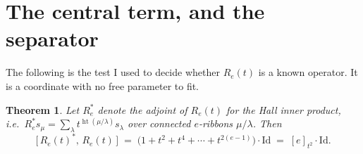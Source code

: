 \documentclass[11pt]{article}
\newtheorem{theorem}{Theorem}
\theoremstyle{definition}
\newcommand{\hgt}{\operatorname{ht}}          %
\begin{document}
\section{The central term, and the separator}

The following is the test I used to decide whether $R_e(t)$ is a known operator.
It is a coordinate with no free parameter to fit.

\begin{theorem}\label{thm:central}
Let $R_e^{*}$ denote the adjoint of $R_e(t)$ for the Hall inner product, i.e.\
$R_e^{*}s_\mu=\sum_\lambda t^{\hgt(\mu/\lambda)}s_\lambda$ over connected
$e$-ribbons $\mu/\lambda$.  Then
\[
   \bigl[\,R_e(t)^{*},\,R_e(t)\,\bigr]\;=\;\bigl(1+t^{2}+t^{4}+\cdots+t^{2(e-1)}\bigr)
   \cdot\mathrm{Id}\;=\;[e]_{t^{2}}\cdot\mathrm{Id}.
\]
\end{theorem}
\end{document}
